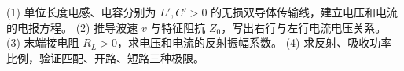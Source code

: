 (1) 单位长度电感、电容分别为 \(L',C'>0\) 的无损双导体传输线，建立电压和电流的电报方程。
(2) 推导波速 \(v\) 与特征阻抗 \(Z_0\)，写出右行与左行电流电压关系。
(3) 末端接电阻 \(R_L>0\)，求电压和电流的反射振幅系数。
(4) 求反射、吸收功率比例，验证匹配、开路、短路三种极限。
